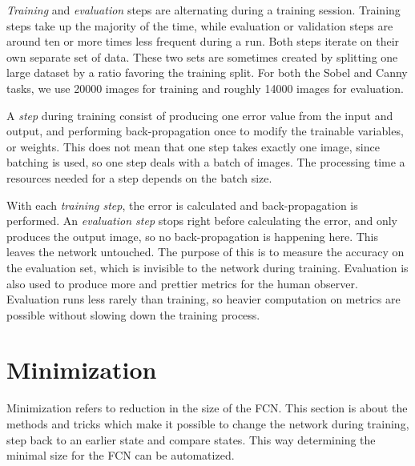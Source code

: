 \documentclass[12pt]{report}
\begin{document}
\textit{Training} and \textit{evaluation} steps are alternating during a training session. Training steps take up the majority of the time, while evaluation or validation steps are around ten or more times less frequent during a run. Both steps iterate on their own separate set of data. These two sets are sometimes created by splitting one large dataset by a ratio favoring the training split. For both the Sobel and Canny tasks, we use 20000 images for training and roughly 14000 images for evaluation.

A \textit{step} during training consist of producing one error value from the input and output, and performing back-propagation once to modify the trainable variables, or weights. This does not mean that one step takes exactly one image, since batching is used, so one step deals with a batch of images. The processing time a resources needed for a step depends on the batch size.

With each \textit{training step}, the error is calculated and back-propagation is performed. An \textit{evaluation step} stops right before calculating the error, and only produces the output image, so no back-propagation is happening here. This leaves the network untouched. The purpose of this is to measure the accuracy on the evaluation set, which is invisible to the network during training. Evaluation is also used to produce more and prettier metrics for the human observer. Evaluation runs less rarely than training, so heavier computation on metrics are possible without slowing down the training process.
\section{Minimization}\label{min}
Minimization refers to reduction in the size of the FCN. This section is about the methods and tricks which make it possible to change the network during training, step back to an earlier state and compare states. This way determining the minimal size for the FCN can be automatized.
\end{document}
